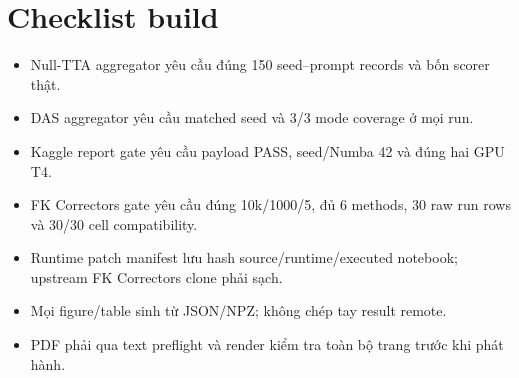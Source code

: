 \documentclass[11pt,a4paper]{article}
\begin{document}
\section{Checklist build}

\begin{itemize}
  \item[$\checkmark$] Null-TTA aggregator yêu cầu đúng 150 seed--prompt records và bốn scorer thật.
  \item[$\checkmark$] DAS aggregator yêu cầu matched seed và 3/3 mode coverage ở mọi run.
  \item[$\checkmark$] Kaggle report gate yêu cầu payload PASS, seed/Numba 42 và đúng hai GPU T4.
  \item[$\checkmark$] FK Correctors gate yêu cầu đúng 10k/1000/5, đủ 6 methods, 30 raw run rows và 30/30 cell compatibility.
  \item[$\checkmark$] Runtime patch manifest lưu hash source/runtime/executed notebook; upstream FK Correctors clone phải sạch.
  \item[$\checkmark$] Mọi figure/table sinh từ JSON/NPZ; không chép tay result remote.
  \item[$\checkmark$] PDF phải qua text preflight và render kiểm tra toàn bộ trang trước khi phát hành.
\end{itemize}



\end{document}
